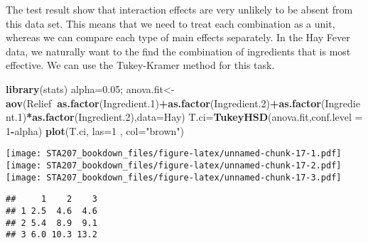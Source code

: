 \documentclass[12pt,]{book}
\newenvironment{Shaded}{\begin{snugshade}}{\end{snugshade}}
\newcommand{\KeywordTok}[1]{\textcolor[rgb]{0.13,0.29,0.53}{\textbf{#1}}}
\newcommand{\DataTypeTok}[1]{\textcolor[rgb]{0.13,0.29,0.53}{#1}}
\newcommand{\DecValTok}[1]{\textcolor[rgb]{0.00,0.00,0.81}{#1}}
\newcommand{\FloatTok}[1]{\textcolor[rgb]{0.00,0.00,0.81}{#1}}
\newcommand{\StringTok}[1]{\textcolor[rgb]{0.31,0.60,0.02}{#1}}
\newcommand{\CommentTok}[1]{\textcolor[rgb]{0.56,0.35,0.01}{\textit{#1}}}
\newcommand{\OperatorTok}[1]{\textcolor[rgb]{0.81,0.36,0.00}{\textbf{#1}}}
\newcommand{\NormalTok}[1]{#1}
\begin{document}
The test result show that interaction effects are very unlikely to be
absent from this data set. This means that we need to treat each
combination as a unit, whereas we can compare each type of main effects
separately. In the Hay Fever data, we naturally want to the find the
combination of ingredients that is most effective. We can use the
Tukey-Kramer method for this task.

\begin{Shaded}
\begin{Highlighting}[]
\KeywordTok{library}\NormalTok{(stats)}
\NormalTok{alpha=}\FloatTok{0.05}\NormalTok{;}
\NormalTok{anova.fit<-}\KeywordTok{aov}\NormalTok{(Relief}\OperatorTok{~}\KeywordTok{as.factor}\NormalTok{(Ingredient.}\DecValTok{1}\NormalTok{)}\OperatorTok{+}\KeywordTok{as.factor}\NormalTok{(Ingredient.}\DecValTok{2}\NormalTok{)}\OperatorTok{+}\KeywordTok{as.factor}\NormalTok{(Ingredient.}\DecValTok{1}\NormalTok{)}\OperatorTok{*}\KeywordTok{as.factor}\NormalTok{(Ingredient.}\DecValTok{2}\NormalTok{),}\DataTypeTok{data=}\NormalTok{Hay)}
\NormalTok{T.ci=}\KeywordTok{TukeyHSD}\NormalTok{(anova.fit,}\DataTypeTok{conf.level =} \DecValTok{1}\OperatorTok{-}\NormalTok{alpha)}
\KeywordTok{plot}\NormalTok{(T.ci, }\DataTypeTok{las=}\DecValTok{1}\NormalTok{ , }\DataTypeTok{col=}\StringTok{"brown"}\NormalTok{)}
\end{Highlighting}
\end{Shaded}

\texttt{[image: STA207\_bookdown\_files/figure-latex/unnamed-chunk-17-1.pdf]}
\texttt{[image: STA207\_bookdown\_files/figure-latex/unnamed-chunk-17-2.pdf]}
\texttt{[image: STA207\_bookdown\_files/figure-latex/unnamed-chunk-17-3.pdf]}

\begin{Shaded}
\end{Shaded}

\begin{verbatim}
##     1    2    3
## 1 2.5  4.6  4.6
## 2 5.4  8.9  9.1
## 3 6.0 10.3 13.2
\end{verbatim}
\end{document}
